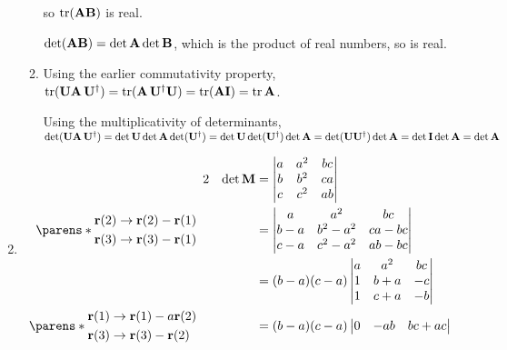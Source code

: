 \documentclass[fleqn,a4paper,11pt]{article}
\begin{document}
\begin{enumerate}[label=\textbf{\arabic*.}]
\begin{enumerate}[label=(\roman*)]
      so \(\operatorname{tr}(\mathbf{A}\mathbf{B})\) is real.

      \(\det(\mathbf{A}\mathbf{B}) = \det\mathbf{A}\det\mathbf{B}\), which is the product of
      real numbers, so is real.
     \item Using the earlier commutativity property,
      \(\operatorname{tr}(\mathbf{U}\mathbf{A}\,\mathbf{U}^\dag)
        = \operatorname{tr}(\mathbf{A}\,\mathbf{U}^\dag\mathbf{U}) = \operatorname{tr}(\mathbf{A}\mathbf{I}) = \operatorname{tr}\mathbf{A}\).

      Using the multiplicativity of determinants,
      \(\det(\mathbf{U}\mathbf{A}\,\mathbf{U}^\dag)
        = \det\mathbf{U}\det\mathbf{A}\det(\mathbf{U}^\dag)
        = \det\mathbf{U}\det(\mathbf{U}^\dag)\det\mathbf{A}
        = \det(\mathbf{U}\mathbf{U}^\dag)\det\mathbf{A}
        = \det\mathbf{I} \det\mathbf{A}
        = \det \mathbf{A}
        \)
   \end{enumerate}
  \item
   \begin{alignat*} 2
    && \det \mat M
     &= \begin{vmatrix}
      a & a^2 & bc \\
      b & b^2 & ca \\
      c & c^2 & ab
     \end{vmatrix} \\
    \parens*{
     \begin{aligned}
      \vec r(2) &\to \vec r(2) - \vec r(1) \\
      \vec r(3) &\to \vec r(3) - \vec r(1)
     \end{aligned}} \quad
    && &= \begin{vmatrix}
      a & a^2 & bc \\
      b - a & b^2 - a^2 & ca - bc \\
      c - a & c^2 - a^2 & ab - bc
     \end{vmatrix} \\
    && &= (b - a)(c - a)\begin{vmatrix}
      a & a^2 & bc \\
      1 & b + a & -c \\
      1 & c + a & -b
     \end{vmatrix} \\
    \parens*{
     \begin{aligned}
      \vec r(1) &\to \vec r(1) - a\vec r(2) \\
      \vec r(3) &\to \vec r(3) - \vec r(2)
     \end{aligned}} \quad
    && &= (b - a)(c - a)\begin{vmatrix}
      0 & -ab & bc + ac \\

\end{vmatrix}
\end{alignat*}
\end{enumerate}
\end{document}
